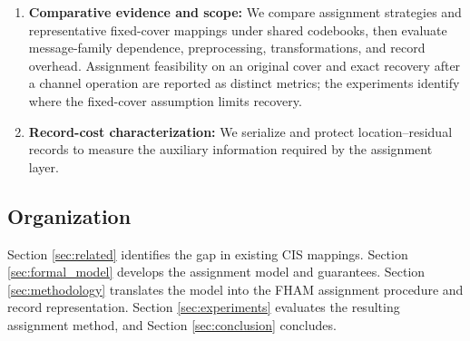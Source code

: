 \documentclass[preprint,12pt]{elsarticle}
\theoremstyle{plain}
\providecommand{\DIFaddtex}[1]{{\protect\color{blue} \sf #1}} %
\providecommand{\DIFdeltex}[1]{{\protect\color{red} \scriptsize #1}} %
\providecommand{\DIFaddbegin}{} %
\providecommand{\DIFaddend}{} %
\providecommand{\DIFdelbegin}{} %
\providecommand{\DIFdelend}{} %
\providecommand{\DIFadd}[1]{\texorpdfstring{\DIFaddtex{#1}}{#1}} %
\providecommand{\DIFdel}[1]{\texorpdfstring{\DIFdeltex{#1}}{}} %
\providecommand{\DIFscaledelfig}{0.5}
\newlength{\DIFdelgraphicswidth} %
\newlength{\DIFdelgraphicsheight} %
\providecommand{\DIFaddincludegraphics}[2][]{{\color{blue}\fbox{\DIFOincludegraphics[#1]{#2}}}} %
\providecommand{\DIFdelincludegraphics}[2][]{%
\sbox{\DIFdelgraphicsbox}{\DIFOincludegraphics[#1]{#2}}%
\settoboxwidth{\DIFdelgraphicswidth}{\DIFdelgraphicsbox} %
\settoboxtotalheight{\DIFdelgraphicsheight}{\DIFdelgraphicsbox} %
\scalebox{\DIFscaledelfig}{%
\parbox[b]{\DIFdelgraphicswidth}{\usebox{\DIFdelgraphicsbox}\\[-\baselineskip] \rule{\DIFdelgraphicswidth}{0em}}\llap{\resizebox{\DIFdelgraphicswidth}{\DIFdelgraphicsheight}{%
\setlength{\unitlength}{\DIFdelgraphicswidth}%
\begin{picture}(1,1)%
\thicklines\linethickness{2pt} %
{\color[rgb]{1,0,0}\put(0,0){\framebox(1,1){}}}%
{\color[rgb]{1,0,0}\put(0,0){\line( 1,1){1}}}%
{\color[rgb]{1,0,0}\put(0,1){\line(1,-1){1}}}%
\end{picture}%
}\hspace*{3pt}}} %
} %
\DeclareRobustCommand{\DIFaddbegin}{\DIFOaddbegin \let\includegraphics\DIFaddincludegraphics} %
\DeclareRobustCommand{\DIFaddend}{\DIFOaddend \let\includegraphics\DIFOincludegraphics} %
\DeclareRobustCommand{\DIFdelbegin}{\DIFOdelbegin \let\includegraphics\DIFdelincludegraphics} %
\DeclareRobustCommand{\DIFdelend}{\DIFOaddend \let\includegraphics\DIFOincludegraphics} %
\renewcommand{\DIFdel}[1]{}
\renewcommand{\DIFdelincludegraphics}[2][]{}
\begin{document}
\begin{enumerate}
    \item \textbf{\DIFdelbegin \DIFdel{Reproducible comparative validation}\DIFdelend \DIFaddbegin \DIFadd{Comparative evidence and scope}\DIFaddend :} We compare \DIFdelbegin \DIFdel{exact matching, bounded and global assignment , Abdulsattar's overlapping Arr.4 mapping, and the WYSAWIS block/category mapping on eight standard images and a 219-image stress corpus. The evaluation includes a minimum-bottleneck baseline, a randomized feasible baseline, a dense-versus-aggregated-flow equivalence check, a causal ablation crossing four codebooks(three FHAM descriptors and Abdulsattar's) with the same assignment strategies, a three-descriptor comparison followed by a validation-gated selection frozen on a disjoint BOSSBase sample, a five-point stability-aware $\lambda$ sweep evaluated under disjoint development/validation transformations, a block-size, descriptor, displacement-bound, and message-preprocessing ablation on 200 LFW covers with a separate scene holdout, the complete four-family eight-length message manifest, a message-length leakage measurement, a 36-condition extended transformation matrix, a 180-image external check, and a stratified robustness check at larger scale across BOSSBase, BOWS2, and COCO~2017. Assignment feasibility }\DIFdelend \DIFaddbegin \DIFadd{assignment strategies and representative fixed-cover mappings under shared codebooks, then evaluate message-family dependence, preprocessing, transformations, }\DIFaddend and \DIFdelbegin \DIFdel{post-transformation recovery }\DIFdelend \DIFaddbegin \DIFadd{record overhead. Assignment feasibility on an original cover and exact recovery after a channel operation }\DIFaddend are reported as \DIFdelbegin \DIFdel{separate metrics}\DIFdelend \DIFaddbegin \DIFadd{distinct metrics; the experiments identify where the fixed-cover assumption limits recovery}\DIFaddend .

    \item \textbf{\DIFdelbegin \DIFdel{Audited assignment representation}\DIFdelend \DIFaddbegin \DIFadd{Record-cost characterization}\DIFaddend :} We serialize and protect \DIFdelbegin \DIFdel{the }\DIFdelend location--residual records to \DIFdelbegin \DIFdel{quantify the metadata }\DIFdelend \DIFaddbegin \DIFadd{measure the auxiliary information }\DIFaddend required by the assignment layer\DIFdelbegin \DIFdel{and establish a reproducible implementation reference}\DIFdelend .
\end{enumerate}

\subsection{Organization}
Section \ref{sec:related} identifies the gap in existing CIS mappings. Section \ref{sec:formal_model} develops the assignment model and guarantees. Section \ref{sec:methodology} translates the model into the FHAM assignment procedure and record representation. Section \ref{sec:experiments} evaluates the resulting assignment method, and Section \ref{sec:conclusion} concludes.
\end{document}
